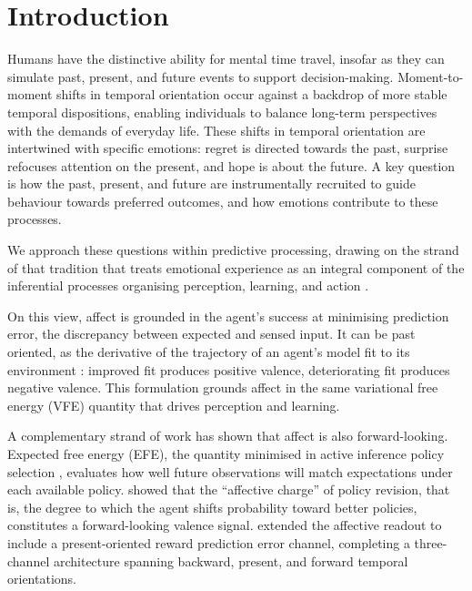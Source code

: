 \documentclass[11pt,a4paper]{article}
\newcommand{\rr}{\color{red!70!black}}
\begin{document}
\section{Introduction}\label{sec:introduction}


{\rr

Humans have the distinctive ability for mental time travel, insofar as they can simulate past, present, and future events to support decision-making. Moment-to-moment shifts in temporal orientation occur against a backdrop of more stable temporal dispositions, enabling individuals to balance long-term perspectives with the demands of everyday life. These shifts in temporal orientation are intertwined with specific emotions: regret is directed towards the past, surprise refocuses attention on the present, and hope is about the future.
A key question is how the past, present, and future are instrumentally recruited to guide behaviour towards preferred outcomes, and how emotions contribute to these processes.

We approach these questions within predictive processing, drawing on the strand of that tradition that treats emotional experience as an integral component of the inferential processes organising perception, learning, and action \citep{barrett2017theory, sethfriston2016, kiverstein2025}.}
On this view, affect is grounded in the agent's success at minimising prediction error, the discrepancy between expected and sensed input. It can be past oriented, as the derivative of the trajectory of an agent's model fit to its environment \citep{joffily2013emotional}: improved fit produces positive valence, deteriorating fit produces negative valence. This formulation grounds affect in the same variational free energy (VFE) quantity that drives perception and learning.

A complementary strand of work has shown that affect is also forward-looking. Expected free energy (EFE), the quantity minimised in active inference policy selection \citep{parr2022active}, evaluates how well future observations will match expectations  under each available policy. \citet{hesp2021deeply} showed that the ``affective charge'' of policy revision, that is, the degree to which the agent shifts probability toward better policies, constitutes a forward-looking valence signal. 
\citet{pattisapu2024free} extended the affective readout to include a present-oriented reward prediction error channel, completing a three-channel architecture spanning backward, present, and forward temporal orientations.
\end{document}
